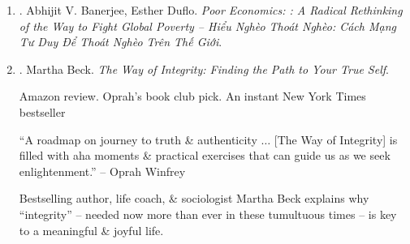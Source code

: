 \documentclass{article}
\begin{document}
\begin{enumerate}
\begin{itemize}
		\item {\sc Esther Duflo} won John Bates Clark medal last year for her work on development economics, so I was excited to read her new book with {\sc Abhijit Banerjee} {\it Poor Economics: A Radical Rethinking of the Way to Fight Global Poverty}. It's a good book. It doesn't really contain a radical rethinking of way to fight global poverty, but it does try to cut past lame debates over whether or not foreign aid ``works'' to instead attempt to find ways to actually assess which programs are working, which aren't, \& how to improve those that don't.'' -- {\sc Matthew Yglesias}, journalist
	\end{itemize}
	{\sf About Author.} {\sc Abhijit V. Banerjee} is Ford Foundation International Professor of Economics at the Massachusetts Institute of Technology. He lives in Cambridge, Massachusetts. {\sc Esther Duflo} is Abdul Latif Jameel Professor of Poverty Alleviation \& Development Economics in Department of Economics at Massachusetts Institute of Technology. She lives in Cambridge, Massachusetts. Together, they are winners of 2019 Nobel Prize in Economics \& coauthors of {\it Good Economics for Hard Times}. They have contributed to outlets as varied as {\it Nature}, NPR's {\it Planet Money}, {\it New York Times}, \& {\it Econometrica}, among others, \& are frequent contributors to French \& Indian press.

	\item \cite{Banerjee_Duflo_poor_economics_VN}. {\sc Abhijit V. Banerjee, Esther Duflo}. {\it Poor Economics: : A Radical Rethinking of the Way to Fight Global Poverty -- Hiểu Nghèo Thoát Nghèo: Cách Mạng Tư Duy Để Thoát Nghèo Trên Thế Giới}.\hfill{\sf[done]}

	\item \cite{Beck_integrity}. {\sc Martha Beck}. {\it The Way of Integrity: Finding the Path to Your True Self}. {}

	{\sf Amazon review.} {\sc Oprah}'s book club pick. An instant New York Times bestseller

	``A roadmap on journey to truth \& authenticity $\ldots$ [The Way of Integrity] is filled with aha moments \& practical exercises that can guide us as we seek enlightenment.'' -- {\sc Oprah Winfrey}

	Bestselling author, life coach, \& sociologist {\sc Martha Beck} explains why ``integrity'' -- needed now more than ever in these tumultuous times -- is key to a meaningful \& joyful life.


\end{enumerate}
\end{document}
